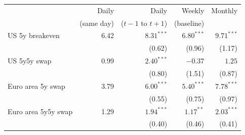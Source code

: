 \begin{tabular}{lrrrr}
\toprule
 & Daily & Daily & Weekly & Monthly\\
 & (same day) & ($t-1$ to $t+1$) & (baseline) & \\
\midrule
US 5y breakeven & 6.42 & $8.31^{***}$ & $6.80^{***}$ & $9.71^{***}$\\
 & & {\footnotesize (0.62)} & {\footnotesize (0.96)} & {\footnotesize (1.17)}\\
US 5y5y swap & 0.99 & $2.40^{***}$ & $-0.37$ & $1.25$\\
 & & {\footnotesize (0.80)} & {\footnotesize (1.51)} & {\footnotesize (0.87)}\\
Euro area 5y swap & 3.79 & $6.00^{***}$ & $5.40^{***}$ & $7.78^{***}$\\
 & & {\footnotesize (0.55)} & {\footnotesize (0.75)} & {\footnotesize (0.97)}\\
Euro area 5y5y swap & 1.29 & $1.94^{***}$ & $1.17^{**}$ & $2.03^{***}$\\
 & & {\footnotesize (0.40)} & {\footnotesize (0.46)} & {\footnotesize (0.41)}\\
\bottomrule
\end{tabular}